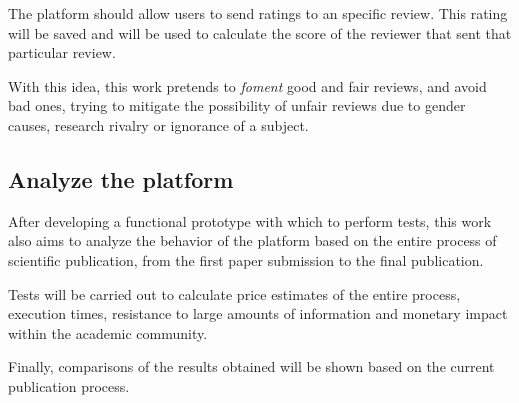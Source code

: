 The platform should allow users to send ratings to an specific review. This
rating will be saved and will be used to calculate the score of the reviewer
that sent that particular review.

With this idea, this work pretends to \emph{foment} good and fair reviews, and
avoid bad ones, trying to mitigate the possibility of unfair reviews due to
gender causes, research rivalry or ignorance of a subject.

\subsection*{Analyze the platform}

After developing a functional prototype with which to perform tests, this work
also aims to analyze the behavior of the platform based on the entire process of
scientific publication, from the first paper submission to the final
publication.

Tests will be carried out to calculate price estimates of the entire process,
execution times, resistance to large amounts of information and monetary impact
within the academic community.

Finally, comparisons of the results obtained will be shown based on the current
publication process.

